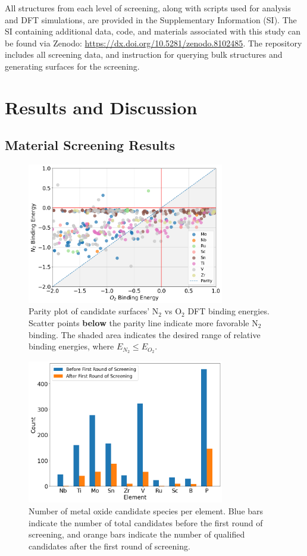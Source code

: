 All structures from each level of screening, along with scripts used for analysis and DFT simulations, are provided in the Supplementary Information (SI).
The SI containing additional data, code, and materials associated with this study can be found via Zenodo: \url{https://dx.doi.org/10.5281/zenodo.8102485}. The repository includes all screening data, and instruction for querying bulk structures and generating surfaces for the screening.


\section*{Results and Discussion}
\subsection{Material Screening Results}

\begin{figure}[h]
\centering
\includegraphics[width=8.6cm]{figures/metal_oxide_figures/Figure 2.png}
\caption{Parity plot of candidate surfaces' N$_2$ vs O$_2$ DFT binding energies. Scatter points \textbf{below} the parity line indicate more favorable N$_2$ binding. The shaded area indicates the desired range of relative binding energies, where $E_{N_2} \le E_{O_2}$.}
\label{fig:exp_All_binding_comparison}
\end{figure}

\begin{figure}[h]
\centering
\includegraphics[width=8.6cm]{figures/metal_oxide_figures/Figure 3.png}
\caption{Number of metal oxide candidate species per element. Blue bars indicate the number of total candidates before the first round of screening, and orange bars indicate the number of qualified candidates after the first round of  screening. }
\label{fig:grouped_metal_count_bar_plot}
\end{figure}

